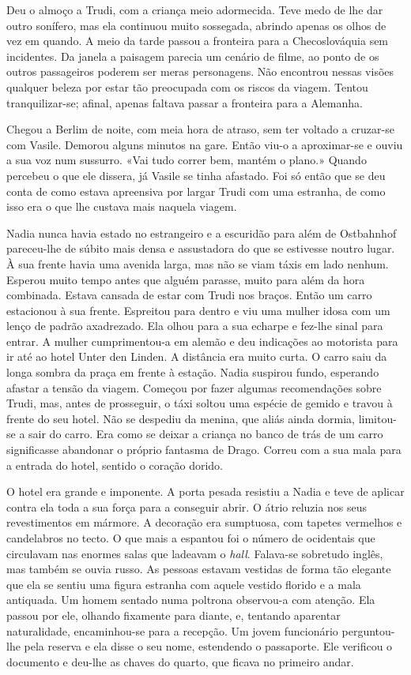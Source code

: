 Deu o almoço a Trudi, com a criança meio adormecida. Teve medo de lhe
dar outro sonífero, mas ela continuou muito sossegada, abrindo apenas os
olhos de vez em quando. A meio da tarde passou a fronteira para a Checoslováquia sem incidentes. Da janela a paisagem parecia um cenário de
filme, ao ponto de os outros passageiros poderem ser meras personagens.
Não encontrou nessas visões qualquer beleza por estar tão preocupada com
os riscos da viagem. Tentou tranquilizar-se; afinal, apenas faltava
passar a fronteira para a Alemanha.

Chegou a Berlim de noite, com meia hora de atraso, sem ter voltado a
cruzar-se com Vasile. Demorou alguns minutos na gare. Então viu-o a
aproximar-se e ouviu a sua voz num sussurro. «Vai tudo correr bem,
mantém o plano.» Quando percebeu o que ele dissera, já Vasile se tinha
afastado. Foi só então que se deu conta de como estava apreensiva
por largar Trudi com uma estranha, de como isso era o que lhe custava
mais naquela viagem.

Nadia nunca havia estado no estrangeiro e a escuridão para além de
Ostbahnhof pareceu-lhe de súbito mais densa e assustadora do que se
estivesse noutro lugar. À sua frente havia uma avenida larga, mas não se
viam táxis em lado nenhum. Esperou muito tempo antes que alguém parasse,
muito para além da hora combinada. Estava cansada de estar com Trudi nos
braços. Então um carro estacionou à sua frente. Espreitou para dentro e
viu uma mulher idosa com um lenço de padrão axadrezado. Ela olhou para a
sua echarpe e fez-lhe sinal para entrar. A mulher cumprimentou-a em
alemão e deu indicações ao motorista para ir até ao hotel Unter den
Linden. A distância era muito curta. O carro saiu da longa sombra da
praça em frente à estação. Nadia suspirou fundo, esperando afastar a
tensão da viagem. Começou por fazer algumas recomendações sobre Trudi,
mas, antes de prosseguir, o táxi soltou uma espécie de gemido e travou à
frente do seu hotel. Não se despediu da menina, que aliás ainda dormia,
limitou-se a sair do carro. Era como se deixar a criança no banco de
trás de um carro significasse abandonar o próprio fantasma de Drago.
Correu com a sua mala para a entrada do hotel, sentido o coração dorido.

O hotel era grande e imponente. A porta pesada resistiu
a Nadia e teve de aplicar contra ela toda a sua força para a conseguir
abrir. O átrio reluzia nos seus revestimentos em mármore. A decoração
era sumptuosa, com tapetes vermelhos e candelabros no tecto. O que mais
a espantou foi o número de ocidentais que circulavam nas enormes salas
que ladeavam o \emph{hall}. Falava-se sobretudo inglês, mas também se
ouvia russo. As pessoas estavam vestidas de
forma tão elegante que ela se sentiu uma figura estranha com aquele
vestido florido e a mala antiquada. Um homem sentado numa poltrona
observou-a com atenção. Ela passou por ele, olhando fixamente para
diante, e, tentando aparentar naturalidade, encaminhou-se para a
recepção. Um jovem funcionário perguntou-lhe pela reserva e ela disse o
seu nome, estendendo o passaporte. Ele verificou o documento e deu-lhe
as chaves do quarto, que ficava no primeiro andar.

